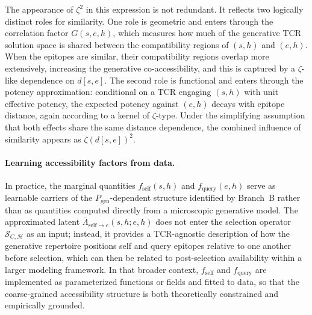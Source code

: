 \documentclass[11pt]{article}
\begin{document}
The appearance of \(\zeta^{2}\) in this expression is not redundant. It reflects two logically distinct roles for similarity. One role is geometric and enters through the correlation factor \(G(s,e,h)\), which measures how much of the generative TCR solution space is shared between the compatibility regions of \((s,h)\) and \((e,h)\). When the epitopes are similar, their compatibility regions overlap more extensively, increasing the generative co-accessibility, and this is captured by a \(\zeta\)-like dependence on \(d[s,e]\). The second role is functional and enters through the potency approximation: conditional on a TCR engaging \((s,h)\) with unit effective potency, the expected potency against \((e,h)\) decays with epitope distance, again according to a kernel of \(\zeta\)-type. Under the simplifying assumption that both effects share the same distance dependence, the combined influence of similarity appears as \(\zeta(d[s,e])^2\).



\paragraph{Learning accessibility factors from data.}
In practice, the marginal quantities $f_{\mathrm{self}}(s,h)$ and
$f_{\mathrm{query}}(e,h)$ serve as learnable carriers of the
$P_{\mathrm{gen}}$-dependent structure identified by Branch~B rather than as
quantities computed directly from a microscopic generative model. The
approximated latent $\bar{\Lambda}_{\mathrm{self}\to e}(s,h; e,h)$ does not
enter the selection operator $\mathcal{S}_{C,\mathcal{H}}$ as an input; instead, it
provides a TCR-agnostic description of how the generative repertoire positions
self and query epitopes relative to one another before selection, which can
then be related to post-selection availability within a larger modeling
framework. In that broader context, $f_{\mathrm{self}}$ and $f_{\mathrm{query}}$
are implemented as parameterized functions or fields and fitted to data, so
that the coarse-grained accessibility structure is both theoretically
constrained and empirically grounded.


\end{document}
